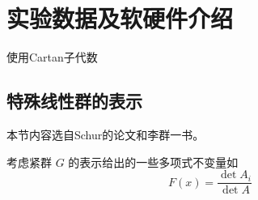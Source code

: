 \section{实验数据及软硬件介绍}

使用Cartan子代数


\subsection{特殊线性群的表示}


本节内容选自Schur的论文和李群一书\cite{Bump2013}。

考虑紧群 $G$ 的表示给出的一些多项式不变量如
\begin{equation*}
    F(x) = \frac{\det A_i}{ \det A}
\end{equation*}

